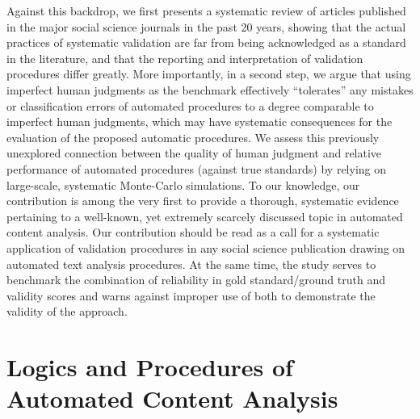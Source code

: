 \documentclass[man, 12pt, a4paper, nolmodern, noextraspace]{apa6}
\begin{document}
    Against this backdrop, we first presents a systematic review of articles published in the major social science journals in the past 20 years, showing that the actual practices of systematic validation are far from being acknowledged as a standard in the literature, and that the reporting and interpretation of validation procedures differ greatly. More importantly, in a second step, we argue that using imperfect human judgments as the benchmark effectively \enquote{tolerates} any mistakes or classification errors of automated procedures to a degree comparable to imperfect human judgments, which may have systematic consequences for the evaluation of the proposed automatic procedures. We assess this previously unexplored connection between the quality of human judgment and relative performance of automated procedures (against true standards) by relying on large-scale, systematic Monte-Carlo simulations. To our knowledge, our contribution is among the very first to provide a thorough, systematic evidence pertaining to a well-known, yet extremely scarcely discussed topic in automated content analysis. Our contribution should be read as a call for a systematic application of validation procedures in any social science publication drawing on automated text analysis procedures. At the same time, the study serves to benchmark the combination of reliability in gold standard/ground truth and validity scores and warns against improper use of both to demonstrate the validity of the approach. 
    
\section{Logics and Procedures of Automated Content Analysis}
\end{document}
